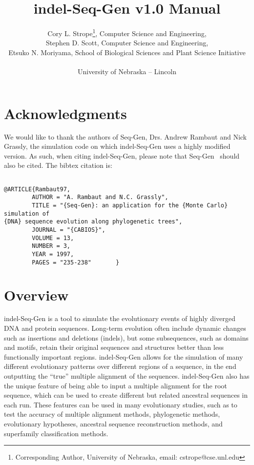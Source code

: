 \documentclass[10pt]{article}
\begin{document}
\title{indel-Seq-Gen v1.0 Manual}
\author{Cory L. Strope\thanks{Corresponding Author, University of Nebraska, email:
cstrope@cse.unl.edu}, Computer Science and Engineering,\\
        Stephen D. Scott, Computer Science and Engineering,\\
        Etsuko N. Moriyama, School of Biological Sciences and Plant Science Initiative\\~\\
	University of Nebraska -- Lincoln
}

\maketitle

\tableofcontents
\newpage
\listoftables
\listoffigures
\newpage
\section{Acknowledgments}

We would like to thank the authors of Seq-Gen, Drs. Andrew Rambaut and Nick Grassly, the simulation code on which indel-Seq-Gen uses a highly modified version. As such, when citing indel-Seq-Gen, please note that Seq-Gen~\cite{Rambaut97} should also be cited.  The bibtex citation is:

\begin{verbatim}

@ARTICLE{Rambaut97,
        AUTHOR = "A. Rambaut and N.C. Grassly",
        TITLE = "{Seq-Gen}: an application for the {Monte Carlo} simulation of
{DNA} sequence evolution along phylogenetic trees",
        JOURNAL = "{CABIOS}",
        VOLUME = 13,
        NUMBER = 3,
        YEAR = 1997,
        PAGES = "235-238"       }

\end{verbatim}

\newpage

\section{Overview}

indel-Seq-Gen is a tool to simulate the evolutionary events of highly diverged DNA and protein sequences.  Long-term evolution often include dynamic changes such as
insertions and deletions (indels), but some subsequences, such as domains and
motifs, retain their original sequences and structures better than less functionally important regions.  indel-Seq-Gen allows for the simulation of many different evolutionary patterns over different regions of a sequence, in the end outputting the ``true'' multiple alignment of the sequences.  indel-Seq-Gen also has the unique feature of being able to input a multiple alignment for the root sequence, which can be used to create different but related ancestral sequences in each run.  These features can be used in many evolutionary studies, such as to test the accuracy of multiple alignment methods, phylogenetic methods, evolutionary hypotheses, ancestral sequence reconstruction methods, and superfamily classification methods.
\end{document}
